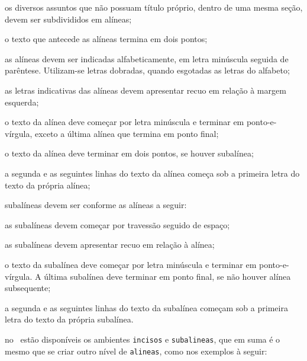 \begin{alineas}

  \item os diversos assuntos que não possuam título próprio, dentro de uma mesma
  seção, devem ser subdivididos em alíneas; 
  
  \item o texto que antecede as alíneas termina em dois pontos;
  \item as alíneas devem ser indicadas alfabeticamente, em letra minúscula
  seguida de parêntese. Utilizam-se letras dobradas, quando esgotadas as
  letras do alfabeto;

  \item as letras indicativas das alíneas devem apresentar recuo em relação à
  margem esquerda;

  \item o texto da alínea deve começar por letra minúscula e terminar em
  ponto-e-vírgula, exceto a última alínea que termina em ponto final;

  \item o texto da alínea deve terminar em dois pontos, se houver subalínea;

  \item a segunda e as seguintes linhas do texto da alínea começa sob a
  primeira letra do texto da própria alínea;
  
  \item subalíneas \cite{nbr6024} devem ser conforme as alíneas a
  seguir:

  \begin{alineas}
     \item as subalíneas devem começar por travessão seguido de espaço;

     \item as subalíneas devem apresentar recuo em relação à alínea;

     \item o texto da subalínea deve começar por letra minúscula e terminar em
     ponto-e-vírgula. A última subalínea deve terminar em ponto final, se não
     houver alínea subsequente;

     \item a segunda e as seguintes linhas do texto da subalínea começam sob a
     primeira letra do texto da própria subalínea.
  \end{alineas}
  
  \item no \abnTeX\ estão disponíveis os ambientes \texttt{incisos} e
  \texttt{subalineas}, que em suma é o mesmo que se criar outro nível de
  \texttt{alineas}, como nos exemplos à seguir:
  

\end{alineas}
